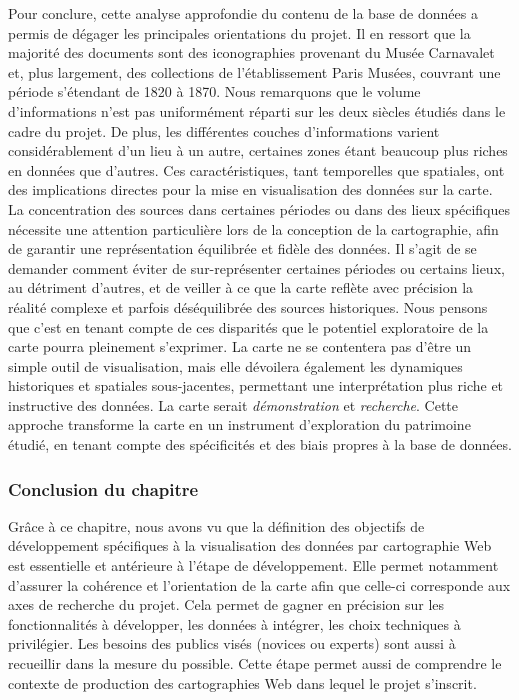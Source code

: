 Pour conclure, cette analyse approfondie du contenu de la base de données a permis de dégager les principales orientations du projet. Il en ressort que la majorité des documents sont des iconographies provenant du Musée Carnavalet et, plus largement, des collections de l'établissement Paris Musées, couvrant une période s'étendant de 1820 à 1870. Nous remarquons que le volume d'informations n'est pas uniformément réparti sur les deux siècles étudiés dans le cadre du projet. De plus, les différentes couches d'informations varient considérablement d'un lieu à un autre, certaines zones étant beaucoup plus riches en données que d'autres. Ces caractéristiques, tant temporelles que spatiales, ont des implications directes pour la mise en visualisation des données sur la carte. La concentration des sources dans certaines périodes ou dans des lieux spécifiques nécessite une attention particulière lors de la conception de la cartographie, afin de garantir une représentation équilibrée et fidèle des données. Il s'agit de se demander comment éviter de sur-représenter certaines périodes ou certains lieux, au détriment d'autres, et de veiller à ce que la carte reflète avec précision la réalité complexe et parfois déséquilibrée des sources historiques. 
Nous pensons que c'est en tenant compte de ces disparités que le potentiel exploratoire de la carte pourra pleinement s'exprimer. La carte ne se contentera pas d'être un simple outil de visualisation, mais elle dévoilera également les dynamiques historiques et spatiales sous-jacentes, permettant une interprétation plus riche et instructive des données. La carte serait \textit{démonstration} et \textit{recherche}. Cette approche transforme la carte en un instrument d'exploration du patrimoine étudié, en tenant compte  des spécificités et des biais propres à la base de données.

\subsubsection{Conclusion du chapitre}
Grâce à ce chapitre, nous avons vu que la définition des objectifs de développement spécifiques à la visualisation des données par cartographie Web est essentielle et antérieure à l'étape de développement. Elle permet notamment d'assurer la cohérence et l'orientation de la carte afin que celle-ci corresponde aux axes de recherche du projet. Cela permet de gagner en précision sur les fonctionnalités à développer, les données à intégrer, les choix techniques à privilégier. Les besoins des publics visés (novices ou experts) sont aussi à recueillir dans la mesure du possible. Cette étape permet aussi de comprendre le contexte de production des cartographies Web dans lequel le projet s'inscrit.
